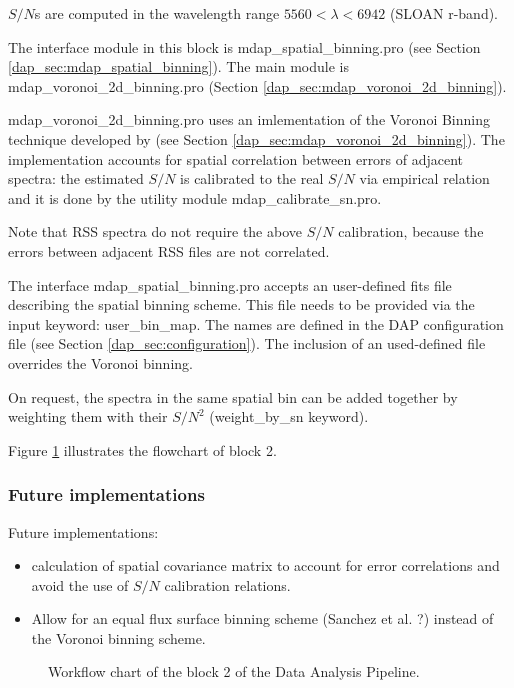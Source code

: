 \documentclass[11pt]{book}
\begin{document}
$S/N$s are computed in the wavelength range $5560 < \lambda < 6942$
(SLOAN r-band).


The interface module in this block is mdap\_spatial\_binning.pro (see
Section \ref{dap_sec:mdap_spatial_binning}). The main module is
mdap\_voronoi\_2d\_binning.pro (Section
\ref{dap_sec:mdap_voronoi_2d_binning}).

mdap\_voronoi\_2d\_binning.pro uses an imlementation of the Voronoi
Binning technique developed by \citet{Cappellari+03} (see Section
\ref{dap_sec:mdap_voronoi_2d_binning}). The implementation accounts
for spatial correlation between errors of adjacent spectra: the
estimated $S/N$ is calibrated to the real $S/N$ via empirical relation
and it is done by the utility module mdap\_calibrate\_sn.pro.

Note that RSS spectra do not require the above $S/N$ calibration,
because the errors between adjacent RSS files are not correlated.


The interface mdap\_spatial\_binning.pro accepts an user-defined fits
file describing the spatial binning scheme. This file needs to be
provided via the input keyword: user\_bin\_map. The names are defined
in the DAP configuration file (see Section
\ref{dap_sec:configuration}). The inclusion of an used-defined file
overrides the Voronoi binning.

On request, the spectra in the same spatial bin can be added together
by weighting them with their $S/N^2$ (weight\_by\_sn keyword).

Figure \ref{dap_fig:block2} illustrates the flowchart of block 2.

\subsubsection{Future implementations}
Future implementations:

\begin{itemize}

 \item calculation of spatial covariance matrix to account for error
   correlations and avoid the use of $S/N$ calibration relations.

  \item Allow for an equal flux surface binning scheme (Sanchez et
    al. ?) instead of the Voronoi binning scheme.

\end{itemize}

\begin{figure}
\begin{center}
\caption{Workflow chart of the block 2 of the Data Analysis
  Pipeline.}
 \label{dap_fig:block2}
\end{center}
\end{figure}
\end{document}
